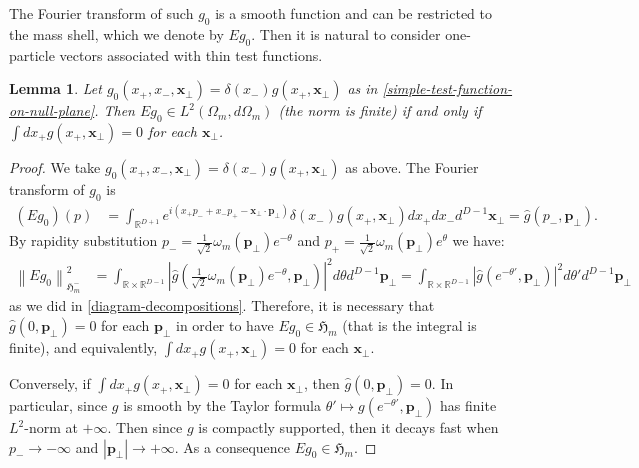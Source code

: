 \documentclass[12pt]{article}
\def\RR{{\mathbb R}}
\def\hm{\mathfrak{H}_m}
\def\tp{\pmb{p}}
\newcommand{\norm}[1]{\left\lVert#1\right\rVert}
\newtheorem{lemma}[theorem]{Lemma}
\theoremstyle{remark}
\begin{document}
 The Fourier transform of such $g_0$ is a smooth function and can be restricted to the mass shell,
 which we denote by $Eg_0$.
 Then it is natural to consider one-particle vectors associated with thin test functions.
    \begin{lemma}\label{lm:zero}
  Let $g_0(x_+,x_-,\pmb{x}_\perp)= \delta(x_-)g(x_+, \pmb{x}_\perp)$ as in \eqref{simple-test-function-on-null-plane}.
  Then $E g_0 \in L^2(\Omega_m, d\Omega_m)$ (the norm is finite) if and only if
 $\int dx_+ g(x_+, \pmb{x}_\perp) = 0$ for each $\pmb{x}_\perp$.
  \end{lemma}
  \begin{proof}
    We take $g_0(x_+,x_-,\pmb{x}_\perp)= \delta(x_-)g(x_+, \pmb{x}_\perp)$ as above. 
   The Fourier transform of $g_0$ is
     \begin{align*}
       (E g_0)(p)&=\int_{\RR^{D+1}} e^{i(x_+p_-+x_-p_+-\pmb{x}_\perp\cdot\tp_\perp)}\delta(x_-)g(x_+, \pmb{x}_\perp)dx_+dx_-d^{D-1}\pmb{x}_\perp=\hat g(p_-, \tp_\perp).
     \end{align*}
    By rapidity substitution $p_- =\frac1{\sqrt 2}\omega_m(\tp_\perp)e^{-\theta}$ and $p_+=\frac1{\sqrt 2}\omega_m(\tp_\perp)e^{\theta}$ we have: 
     \begin{align*}
       \norm{E g_0}^2_{\hm^-}&=\int_{\RR\times \RR^{D-1}} \left|\hat g\left(\frac1{\sqrt 2}\omega_m(\tp_\perp)e^{-\theta}, \tp_\perp\right)\right|^2d\theta d^{D-1}\tp_\perp
       =\int_{\RR\times \RR^{D-1}} |\hat g(e^{-\theta'}, \tp_\perp)|^2d\theta' d^{D-1}\tp_\perp
     \end{align*}
    as we did in \eqref{diagram-decompositions}.
    Therefore,
    it is necessary that $\hat{g}(0,\tp_\perp) = 0$ for each $\tp_\perp$ in order to have $E g_0\in \hm$ (that is the integral is finite),
    and equivalently,  $\int dx_+ g(x_+, \pmb{x}_\perp) = 0$ for each $\pmb{x}_\perp$.

    Conversely, if $\int dx_+ g(x_+, \pmb{x}_\perp) = 0$ for each $\pmb{x}_\perp$, then $\hat g(0, \tp_\perp)= 0$. In particular, since $g$ is smooth by the Taylor formula $\theta'\mapsto g(e^{-\theta'},\tp_\perp)$ has finite $L^2$-norm at $+\infty$. Then since $g$ is  compactly supported, then it decays fast when $p_-\rightarrow-\infty$ and $|\tp_\perp|\rightarrow+\infty$. As a consequence $E g_0\in \hm$.
\end{proof}
\end{document}
